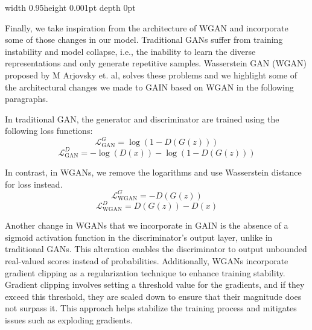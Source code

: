 \textcolor{gray!80}{\vrule width 0.95\columnwidth height 0.001pt depth 0pt \relax}

\vspace{1ex}

Finally, we take inspiration from the architecture of WGAN and incorporate some of those changes in our model. Traditional GANs suffer from training instability and model collapse, i.e., the inability to learn the diverse representations and only generate repetitive samples. Wasserstein GAN (WGAN) proposed by M Arjovsky et. al, solves these problems and we highlight some of the architectural changes we made to GAIN based on WGAN in the following paragraphs.

In traditional GAN, the generator and discriminator are trained using the following loss functions:
\[
\mathcal{L}_{\text{GAN}}^G = \log(1 - D(G(z)))
\]
\[
\mathcal{L}_{\text{GAN}}^D = -\log(D(x)) - \log(1 - D(G(z)))
\]

In contrast, in WGANs, we remove the logarithms and use Wasserstein distance for loss instead.
\[
\mathcal{L}_{\text{WGAN}}^G = -D(G(z))
\]
\[
\mathcal{L}_{\text{WGAN}}^D = D(G(z)) - D(x)
\]

Another change in WGANs that we incorporate in GAIN is the absence of a sigmoid activation function in the discriminator's output layer, unlike in traditional GANs. This alteration enables the discriminator to output unbounded real-valued scores instead of probabilities. Additionally, WGANs incorporate gradient clipping as a regularization technique to enhance training stability. Gradient clipping involves setting a threshold value for the gradients, and if they exceed this threshold, they are scaled down to ensure that their magnitude does not surpass it. This approach helps stabilize the training process and mitigates issues such as exploding gradients.
